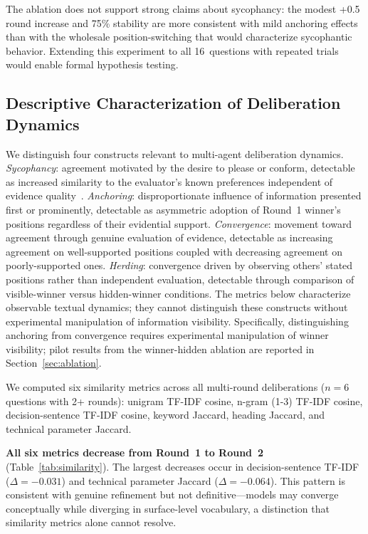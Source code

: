 \documentclass[11pt,a4paper]{article}
\begin{document}
The ablation does not support strong claims about sycophancy: the modest +0.5 round increase and 75\% stability are more consistent with mild anchoring effects than with the wholesale position-switching that would characterize sycophantic behavior. Extending this experiment to all 16~questions with repeated trials would enable formal hypothesis testing.

\subsection{Descriptive Characterization of Deliberation Dynamics}
\label{sec:similarity}

We distinguish four constructs relevant to multi-agent deliberation dynamics. \textit{Sycophancy}: agreement motivated by the desire to please or conform, detectable as increased similarity to the evaluator's known preferences independent of evidence quality~\cite{sharma2024sycophancy,perez2022sycophancy}. \textit{Anchoring}: disproportionate influence of information presented first or prominently, detectable as asymmetric adoption of Round~1 winner's positions regardless of their evidential support. \textit{Convergence}: movement toward agreement through genuine evaluation of evidence, detectable as increasing agreement on well-supported positions coupled with decreasing agreement on poorly-supported ones. \textit{Herding}: convergence driven by observing others' stated positions rather than independent evaluation, detectable through comparison of visible-winner versus hidden-winner conditions. The metrics below characterize observable textual dynamics; they cannot distinguish these constructs without experimental manipulation of information visibility. Specifically, distinguishing anchoring from convergence requires experimental manipulation of winner visibility; pilot results from the winner-hidden ablation are reported in Section~\ref{sec:ablation}.

We computed six similarity metrics across all multi-round deliberations ($n = 6$ questions with 2+ rounds): unigram TF-IDF cosine, n-gram (1-3) TF-IDF cosine, decision-sentence TF-IDF cosine, keyword Jaccard, heading Jaccard, and technical parameter Jaccard.

\textbf{All six metrics decrease from Round~1 to Round~2} (Table~\ref{tab:similarity}). The largest decreases occur in decision-sentence TF-IDF ($\Delta = -0.031$) and technical parameter Jaccard ($\Delta = -0.064$). This pattern is consistent with genuine refinement but not definitive---models may converge conceptually while diverging in surface-level vocabulary, a distinction that similarity metrics alone cannot resolve.
\end{document}
